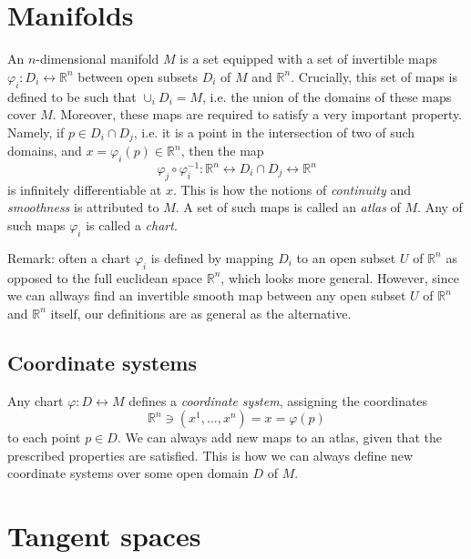 \documentclass[aps,prl,twocolumn,groupedaddress]{revtex4-2}
\newcommand{\RR}{\mathbb{R}}
\begin{document}
\maketitle
\onecolumngrid

\section{Manifolds}

An $n$-dimensional manifold $M$ is a set equipped with a set of invertible maps $\varphi_i:D_i\leftrightarrow \RR^n$ between open subsets $D_i$ of $M$ and $\RR^n$.
Crucially, this set of maps is defined to be such that $\cup_i D_i = M$, i.e. the union of the domains of these maps cover $M$.
Moreover, these maps are required to satisfy a very important property.
Namely, if $p \in D_i\cap D_j$, i.e. it is a point in the intersection of two of such domains, and $x = \varphi_i(p)\in \RR^n$, then the map
$$
\varphi_j \circ \varphi_i^{-1} : \RR^n \leftrightarrow D_i\cap D_j \leftrightarrow \RR^n
$$
is infinitely differentiable at $x$.
This is how the notions of {\em continuity} and {\em smoothness} is attributed to $M$.
A set of such maps is called an {\em atlas} of $M$.
Any of such maps $\varphi_i$ is called a {\em chart}.

Remark: often a chart $\varphi_i$ is defined by mapping $D_i$ to an open subset $U$ of $\RR^n$ as opposed to the full euclidean space $\RR^n$, which looks more general.
However, since we can allways find an invertible smooth map between any open subset $U$ of $\RR^n$ and $\RR^n$ itself, our definitions are as general as the alternative.

\subsection{Coordinate systems}

Any chart $\varphi:D\leftrightarrow M$ defines a {\em coordinate system}, assigning the coordinates
$$
\RR^n \ni (x^1,...,x^n) = x = \varphi(p)
$$
to each point $p\in D$.
We can always add new maps to an atlas, given that the prescribed properties are satisfied.
This is how we can always define new coordinate systems over some open domain $D$ of $M$.

\section{Tangent spaces}
\end{document}
